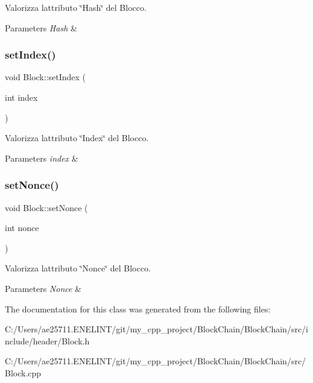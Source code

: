 Valorizza l\textquotesingle{}attributo \char`\"{}\+Hash\char`\"{} del Blocco. 


\begin{DoxyParams}{Parameters}
{\em Hash} & \\
\hline
\end{DoxyParams}
\mbox{\label{class_block_a08fb67d8f1908100a324601d4c185b54}} 
\subsubsection{\texorpdfstring{set\+Index()}{setIndex()}}
{\footnotesize\ttfamily void Block\+::set\+Index (\begin{DoxyParamCaption}\item[{int}]{index }\end{DoxyParamCaption})\hspace{0.3cm}{\ttfamily [virtual]}}



Valorizza l\textquotesingle{}attributo \char`\"{}\+Index\char`\"{} del Blocco. 


\begin{DoxyParams}{Parameters}
{\em index} & \\
\hline
\end{DoxyParams}
\mbox{\label{class_block_afe8d6e723262945cd8d2fd5316afda06}} 
\subsubsection{\texorpdfstring{set\+Nonce()}{setNonce()}}
{\footnotesize\ttfamily void Block\+::set\+Nonce (\begin{DoxyParamCaption}\item[{int}]{nonce }\end{DoxyParamCaption})\hspace{0.3cm}{\ttfamily [virtual]}}



Valorizza l\textquotesingle{}attributo \char`\"{}\+Nonce\char`\"{} del Blocco. 


\begin{DoxyParams}{Parameters}
{\em Nonce} & \\
\hline
\end{DoxyParams}


The documentation for this class was generated from the following files\+:\begin{DoxyCompactItemize}
\item 
C\+:/\+Users/ae25711.\+E\+N\+E\+L\+I\+N\+T/git/my\+\_\+cpp\+\_\+project/\+Block\+Chain/\+Block\+Chain/src/include/header/Block.\+h\item 
C\+:/\+Users/ae25711.\+E\+N\+E\+L\+I\+N\+T/git/my\+\_\+cpp\+\_\+project/\+Block\+Chain/\+Block\+Chain/src/Block.\+cpp\end{DoxyCompactItemize}
